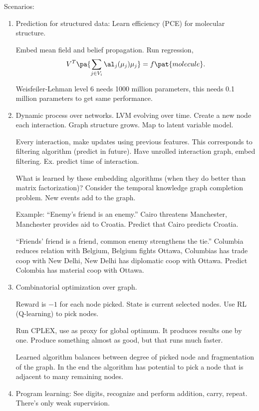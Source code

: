Scenarios:
\begin{enumerate}
\item
Prediction for structured data: Learn efficiency (PCE) for molecular structure. 

Embed mean field and belief propagation. Run regression, $$V^T \pa{\sum_{j\in V_i} \al_j(\mu_j)\mu_j} = f\pat{molecule}.$$ 

Weisfeiler-Lehman level 6 needs 1000 million parameters, this needs 0.1 million parameters to get same performance.
\item
Dynamic process over networks. LVM evolving over time. Create a new node each interaction. Graph structure grows. Map to latent variable model. %

Every interaction, make updates using previous features.  This corresponds to filtering algorithm (predict in future).
Have unrolled interaction graph, embed filtering. %
Ex. predict time of interaction.

What is learned by these embedding algorithms (when they do better than matrix factorization)? Consider the temporal knowledge graph completion problem. New events add to the graph.

Example: ``Enemy's friend is an enemy.'' Cairo threatens Manchester, Manchester provides aid to Croatia. Predict that Cairo predicts Croatia. 

``Friends' friend is a friend, common enemy strengthens the tie.'' 
Columbia reduces relation with Belgium, Belgium fights Ottawa, Columbias has trade coop with New Delhi, New Delhi has diplomatic coop with Ottawa. Predict Colombia has  material coop with Ottawa. 
\item
Combinatorial optimization over graph.

Reward is $-1$ for each node picked.
State is current selected nodes.
Use RL (Q-learning) to pick nodes.

Run CPLEX, use as proxy for global optimum. It produces results one by one. Produce something almost as good, but that runs much faster.

Learned algorithm balances between degree of picked node and fragmentation of the graph. 
In the end the algorithm has potential to pick a node that is adjacent to many remaining nodes. 
\item
Program learning: See digits, recognize and perform addition, carry, repeat. There's only weak supervision.
\end{enumerate}





